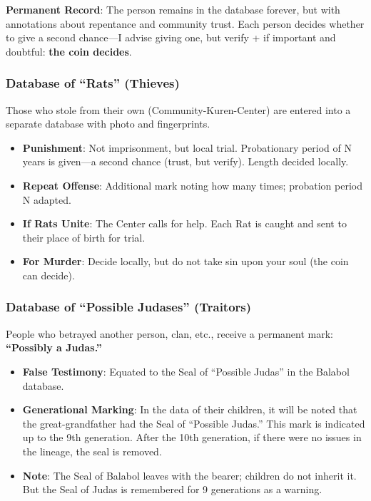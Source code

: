 \documentclass[11pt,a4paper]{article}
\theoremstyle{definition}
\theoremstyle{remark}
\begin{document}
\textbf{Permanent Record}: The person remains in the database forever, but with annotations about repentance and community trust. Each person decides whether to give a second chance—I advise giving one, but verify + if important and doubtful: \textbf{the coin decides}.

\subsubsection{Database of ``Rats'' (Thieves)}

Those who stole from their own (Community-Kuren-Center) are entered into a separate database with photo and fingerprints.

\begin{itemize}
\item \textbf{Punishment}: Not imprisonment, but local trial. Probationary period of N years is given—a second chance (trust, but verify). Length decided locally.
\item \textbf{Repeat Offense}: Additional mark noting how many times; probation period N adapted.
\item \textbf{If Rats Unite}: The Center calls for help. Each Rat is caught and sent to their place of birth for trial.
\item \textbf{For Murder}: Decide locally, but do not take sin upon your soul (the coin can decide).
\end{itemize}

\subsubsection{Database of ``Possible Judases'' (Traitors)}

People who betrayed another person, clan, etc., receive a permanent mark: \textbf{``Possibly a Judas.''}

\begin{itemize}
\item \textbf{False Testimony}: Equated to the Seal of ``Possible Judas'' in the Balabol database.
\item \textbf{Generational Marking}: In the data of their children, it will be noted that the great-grandfather had the Seal of ``Possible Judas.'' This mark is indicated up to the 9th generation. After the 10th generation, if there were no issues in the lineage, the seal is removed.
\item \textbf{Note}: The Seal of Balabol leaves with the bearer; children do not inherit it. But the Seal of Judas is remembered for 9 generations as a warning.
\end{itemize}
\end{document}

